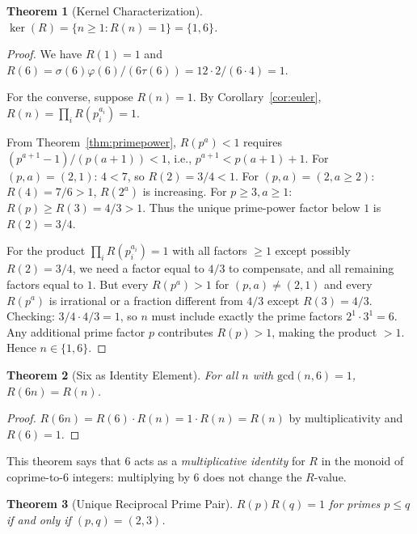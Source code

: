 \documentclass[12pt]{article}
\newtheorem{theorem}{Theorem}[section]
\newcommand{\gcd}{\mathrm{gcd}}
\begin{document}
\begin{theorem}[Kernel Characterization]\label{thm:kernel}
$\ker(R) = \{n\ge 1 : R(n)=1\} = \{1, 6\}$.
\end{theorem}

\begin{proof}
We have $R(1)=1$ and $R(6)=\sigma(6)\varphi(6)/(6\tau(6))=12\cdot2/(6\cdot4)=1$.

For the converse, suppose $R(n)=1$.  By Corollary~\ref{cor:euler},
$R(n)=\prod_i R(p_i^{a_i})=1$.

From Theorem~\ref{thm:primepower}, $R(p^a)<1$ requires
$(p^{a+1}-1)/(p(a+1))<1$, i.e., $p^{a+1}<p(a+1)+1$.
For $(p,a)=(2,1)$: $4<7$, so $R(2)=3/4<1$.
For $(p,a)=(2,a\ge2)$: $R(4)=7/6>1$, $R(2^a)$ is increasing.
For $p\ge3,a\ge1$: $R(p)\ge R(3)=4/3>1$.
Thus the unique prime-power factor below $1$ is $R(2)=3/4$.

For the product $\prod_i R(p_i^{a_i})=1$ with all factors $\ge1$ except
possibly $R(2)=3/4$, we need a factor equal to $4/3$ to compensate, and all
remaining factors equal to $1$.  But every $R(p^a)>1$ for $(p,a)\ne(2,1)$
and every $R(p^a)$ is irrational or a fraction different from $4/3$ except
$R(3)=4/3$.  Checking: $3/4\cdot4/3=1$, so $n$ must include exactly the
prime factors $2^1\cdot3^1=6$.  Any additional prime factor $p$ contributes
$R(p)>1$, making the product $>1$.  Hence $n\in\{1,6\}$.
\end{proof}

\begin{theorem}[Six as Identity Element]\label{thm:identity}
For all $n$ with $\gcd(n,6)=1$, $R(6n) = R(n)$.
\end{theorem}

\begin{proof}
$R(6n) = R(6)\cdot R(n) = 1\cdot R(n) = R(n)$ by multiplicativity and
$R(6)=1$.
\end{proof}

This theorem says that $6$ acts as a \emph{multiplicative identity} for $R$
in the monoid of coprime-to-6 integers: multiplying by $6$ does not change the
$R$-value.

\begin{theorem}[Unique Reciprocal Prime Pair]\label{thm:recpair}
$R(p)R(q)=1$ for primes $p\le q$ if and only if $(p,q)=(2,3)$.
\end{theorem}
\end{document}
